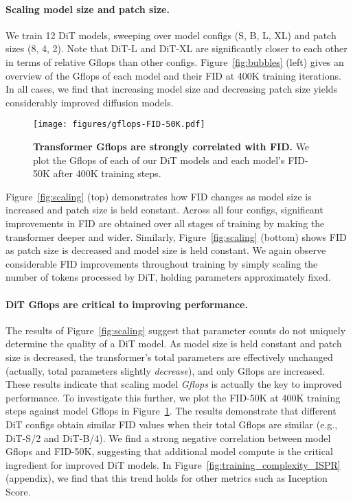 \documentclass[10pt,twocolumn,letterpaper]{article}
\begin{document}
\vspace{-2mm}
\paragraph{Scaling model size and patch size.}
We train 12 DiT models, sweeping over model configs (S, B, L, XL) and patch sizes (8, 4, 2). Note that DiT-L and DiT-XL are significantly closer to each other in terms of relative Gflops than other configs. Figure~\ref{fig:bubbles} (left) gives an overview of the Gflops of each model and their FID at 400K training iterations. In all cases, we find that increasing model size and decreasing patch size yields considerably improved diffusion models.

\begin{figure}\centering\vspace{-0.85mm}
\texttt{[image: figures/gflops-FID-50K.pdf]}
\vspace{-5.4mm}
\caption{\textbf{Transformer Gflops are strongly correlated with FID.} We plot the Gflops of each of our DiT models and each model's FID-50K after 400K training steps.}\vspace{-4mm}
\label{fig:gflop_line}
\end{figure}

Figure~\ref{fig:scaling} (top) demonstrates how FID changes as model size is increased and patch size is held constant. Across all four configs, significant improvements in FID are obtained over all stages of training by making the transformer deeper and wider. Similarly, Figure~\ref{fig:scaling} (bottom) shows FID as patch size is decreased and model size is held constant. We again observe considerable FID improvements throughout training by simply scaling the number of tokens processed by DiT, holding parameters approximately fixed.

\vspace{-3mm}
\paragraph{DiT Gflops are critical to improving performance.}

The results of Figure~\ref{fig:scaling} suggest that parameter counts do not uniquely determine the quality of a DiT model. As model size is held constant and patch size is decreased, the transformer's total parameters are effectively unchanged (actually, total parameters slightly \textit{decrease}), and only Gflops are increased. These results indicate that scaling model \textit{Gflops} is actually the key to improved performance. To investigate this further, we plot the FID-50K at 400K training steps against model Gflops in Figure~\ref{fig:gflop_line}. The results demonstrate that different DiT configs obtain similar FID values when their total Gflops are similar (e.g., DiT-S/2 and DiT-B/4). We find a strong negative correlation between model Gflops and FID-50K, suggesting that additional model compute is the critical ingredient for improved DiT models. In Figure~\ref{fig:training_complexity_ISPR} (appendix), we find that this trend holds for other metrics such as Inception Score.
\end{document}
